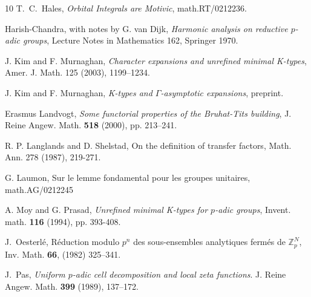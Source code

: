 \documentclass[11pt]{amsart}
\theoremstyle{definition}
\theoremstyle{remark}
\numberwithin{equation}{theorem}
\newcommand{\ring}[1]{\mathbb{#1}}
\begin{document}
\begin{thebibliography}{10}
 T.~C.~Hales, {\it Orbital Integrals are Motivic},
math.RT/0212236.

Harish-Chandra, with notes by G. van Dijk, {\em Harmonic analysis
on reductive $p$-adic groups}, Lecture Notes in Mathematics 162,
Springer 1970.

 J. Kim and F. Murnaghan, {\em Character expansions and unrefined
minimal K-types}, Amer. J. Math. 125 (2003), 1199--1234.

 J. Kim and F. Murnaghan, {\em K-types and $\Gamma$-asymptotic
expansions}, preprint.


 Erasmus Landvogt, {\em Some functorial properties of
the Bruhat-Tits building}, J. Reine Angew. Math. {\bf 518} (2000),
pp. 213--241.






 R. P. Langlands and D. Shelstad, On the definition of
transfer factors, Math. Ann. 278 (1987), 219-271.

 G. Laumon, Sur le lemme fondamental
pour les groupes unitaires, math.AG/0212245


A. Moy and G. Prasad, {\em Unrefined minimal K-types for $p$-adic
groups}, Invent. math. {\bf 116} (1994), pp. 393-408.



 J.~Oesterl\'e, {R\'eduction modulo $p^n$ des
sous-ensembles analytiques ferm\'es de $\ring{Z}_p^N$}, Inv. Math.
{\bf 66}, (1982) 325--341.

 J.~Pas,
{\it Uniform $p$-adic cell decomposition and local zeta
functions}. J. Reine Angew. Math. {\bf 399} (1989), 137--172.


\end{thebibliography}
\end{document}
